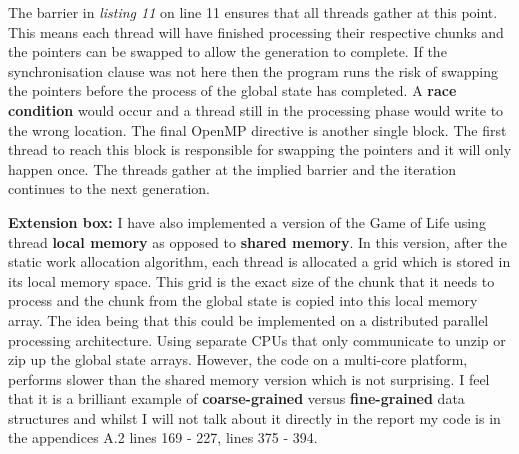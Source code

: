 \documentclass[11pt]{article} %
\begin{document}
The barrier in {\it listing 11} on line 11 ensures that all threads gather at this point. This means each thread will have finished processing their respective chunks and the pointers can be swapped to allow the generation to complete. If the synchronisation clause was not here then the program runs the risk of swapping the pointers before the process of the global state has completed. A {\bf race condition} would occur and a thread still in the processing phase would write to the wrong location. The final OpenMP directive is another single block. The first thread to reach this block is responsible for swapping the pointers and it will only happen once. The threads gather at the implied barrier and the iteration continues to the next generation.
\bigskip
\begin{mdframed}
{\bf Extension box: } I have also implemented a version of the Game of Life using thread {\bf local memory} as opposed to {\bf shared memory}. In this version, after the static work allocation algorithm, each thread is allocated a grid which is stored in its local memory space. This grid is the exact size of the chunk that it needs to process and the chunk from the global state is copied into this local memory array. The idea being that this could be implemented on a distributed parallel processing architecture. Using separate CPUs that only communicate to unzip or zip up the global state arrays. However, the code on a multi-core platform, performs slower than the shared memory version which is not surprising. I feel that it is a brilliant example of {\bf coarse-grained} versus {\bf fine-grained} data structures and whilst I will not talk about it directly in the report my code is in the appendices A.2 lines 169 - 227, lines 375 - 394.
\end{mdframed}
\end{document}
